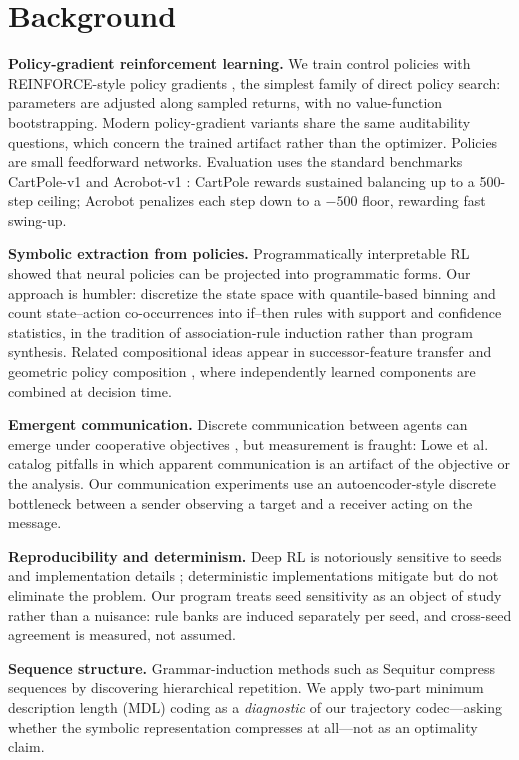\documentclass[11pt]{article}
\begin{document}
\section{Background}

\textbf{Policy-gradient reinforcement learning.} We train control policies with REINFORCE-style policy gradients \cite{williams1992}, the simplest family of direct policy search: parameters are adjusted along sampled returns, with no value-function bootstrapping. Modern policy-gradient variants \cite{schulman2017} share the same auditability questions, which concern the trained artifact rather than the optimizer. Policies are small feedforward networks. Evaluation uses the standard benchmarks CartPole-v1 and Acrobot-v1 \cite{brockman2016}: CartPole rewards sustained balancing up to a 500-step ceiling; Acrobot penalizes each step down to a $-500$ floor, rewarding fast swing-up.

\textbf{Symbolic extraction from policies.} Programmatically interpretable RL \cite{verma2018} showed that neural policies can be projected into programmatic forms. Our approach is humbler: discretize the state space with quantile-based binning and count state--action co-occurrences into if--then rules with support and confidence statistics, in the tradition of association-rule induction rather than program synthesis. Related compositional ideas appear in successor-feature transfer \cite{barreto2017} and geometric policy composition \cite{thakoor2022}, where independently learned components are combined at decision time.

\textbf{Emergent communication.} Discrete communication between agents can emerge under cooperative objectives \cite{foerster2016,havrylov2017}, but measurement is fraught: Lowe et al.\ \cite{lowe2019} catalog pitfalls in which apparent communication is an artifact of the objective or the analysis. Our communication experiments use an autoencoder-style discrete bottleneck between a sender observing a target and a receiver acting on the message.

\textbf{Reproducibility and determinism.} Deep RL is notoriously sensitive to seeds and implementation details \cite{henderson2018}; deterministic implementations \cite{nagarajan2018} mitigate but do not eliminate the problem. Our program treats seed sensitivity as an object of study rather than a nuisance: rule banks are induced separately per seed, and cross-seed agreement is measured, not assumed.

\textbf{Sequence structure.} Grammar-induction methods such as Sequitur \cite{nevill-manning1997} compress sequences by discovering hierarchical repetition. We apply two-part minimum description length (MDL) coding as a \textit{diagnostic} of our trajectory codec---asking whether the symbolic representation compresses at all---not as an optimality claim.
\end{document}
